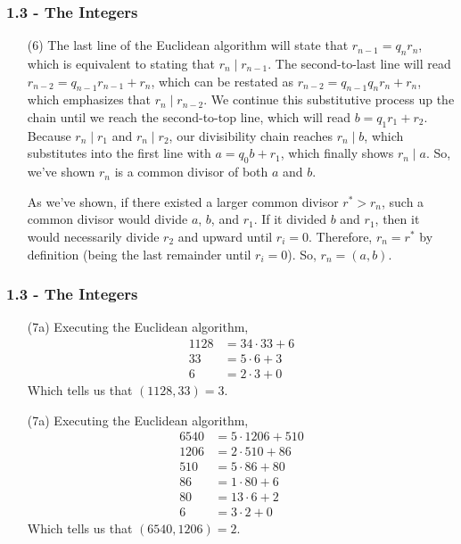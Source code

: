 \documentclass{beamer}
\begin{document}
\begin{frame}
\frametitle{1.3 - The Integers}
\small
\begin{enumerate}
	\item[(6)] \quad The last line of the Euclidean algorithm will state that $r_{n-1} = q_n r_n$, which is equivalent to stating that $r_n\mid r_{n-1}$. The second-to-last line will read $r_{n-2} = q_{n-1} r_{n-1} + r_n$, which can be restated as $r_{n-2} = q_{n-1} q_n r_n + r_n$, which emphasizes that $r_n\mid r_{n-2}$. We continue this substitutive process up the chain until we reach the second-to-top line, which will read $b=q_1 r_1 + r_2$. Because $r_n\mid r_1$ and $r_n\mid r_2$, our divisibility chain reaches $r_n\mid b$, which substitutes into the first line with $a = q_0 b + r_1$, which finally shows $r_n\mid a$. So, we've shown $r_n$ is a common divisor of both $a$ and $b$.
	
	\quad As we've shown, if there existed a larger common divisor $r^*>r_n$, such a common divisor would divide $a$, $b$, and $r_1$. If it divided $b$ and $r_1$, then it would necessarily divide $r_2$ and upward until $r_i=0$. Therefore, $r_n = r^*$ by definition (being the last remainder until $r_i = 0$). So, $r_n = (a, b)$.
\end{enumerate}
\end{frame}
\begin{frame}
\frametitle{1.3 - The Integers}
\small
\begin{enumerate}
	\item[(7a)] Executing the Euclidean algorithm,
	\begin{align*}
	1128 &= 34\cdot 33 + 6 \\
	33 &= 5\cdot 6 + 3 \\
	6 &= 2\cdot 3 + 0
	\end{align*}
	Which tells us that $(1128, 33) = 3$.
	
	\item[(7a)] Executing the Euclidean algorithm,
	\begin{align*}
	6540 &= 5\cdot 1206 + 510 \\
	1206 &= 2\cdot 510 + 86 \\
	510 &= 5\cdot 86 + 80 \\
	86 &= 1\cdot 80 + 6 \\
	80 &= 13\cdot 6 + 2 \\
	6 &= 3\cdot 2 + 0
	\end{align*}
	Which tells us that $(6540, 1206) = 2$.
\end{enumerate}
\end{frame}
\end{document}
